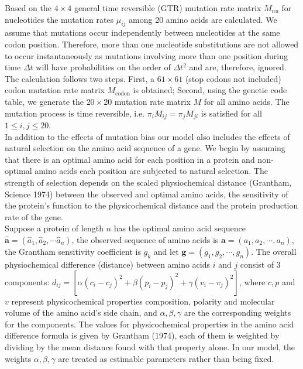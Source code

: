 \documentclass[13pt]{article}
\begin{document}
Based on the $4 \times 4$ general time reversible (GTR) mutation rate matrix $M_{nu}$ for nucleotides the mutation rates $\mu_{ij}$ among 20 amino acids are calculated. We assume that mutations occur independently between nucleotides at the same codon position. Therefore, more than one nucleotide substitutions are not allowed to occur instantaneously as mutations involving more than one position during time $\Delta t$ will have probabilities on the order of $\Delta t^2$ and are, therefore, ignored. The calculation follows two steps. First, a $61 \times 61$ (stop codons not included) codon mutation rate matrix $M_{\text{codon}}$ is obtained; Second, using the genetic code table, we generate the $20 \times 20$ mutation rate matrix $M$ for all amino acids. The mutation process is time reversible, i.e. $\pi_i M_{ij} = \pi_j M_{ji}$ is satisfied for all $1 \le i, j \le 20$.\\

In addition to the effects of mutation bias our model also includes the effects of natural selection on the amino acid sequence of a gene. We begin by assuming that there is an optimal amino acid for each position in a protein and non-optimal amino acids each position are subjected to natural selection. The strength of selection depends on the scaled physiochemical distance (Grantham, Science 1974) between the observed and optimal amino acids, the sensitivity of the protein's function to the physicochemical distance and the protein production rate of the gene. \\

Suppose a protein of length $n$ has the optimal amino acid sequence $\hat{\mathbf{a}} = (\hat{a}_1, \hat{a}_2, \cdots \hat{a}_n)$, the observed sequence of amino acids is $\mathbf{a} = (a_1, a_2, \cdots, a_n)$, the Grantham sensitivity coefficient is $g_k$ and let $\mathbf{g}=(g_1,g_2,\cdots,g_n)$. The overall physiochemical difference (distance) between amino acids $i$ and $j$ consist of 3 components: $d_{ij} = [\alpha (c_i-c_j)^2 + \beta (p_i - p_j)^2 + \gamma (v_i - v_j)^2]$, where $c, p$ and $v$ represent physicochemical properties composition, polarity and molecular volume of the amino acid's side chain, and $\alpha, \beta, \gamma$ are the corresponding weights for the components. The values for physicochemical properties in the amino acid difference formula is given by Grantham (1974), each of them is weighted by dividing by the mean distance found with that property alone. In our model, the weights $\alpha, \beta, \gamma$ are treated as estimable parameters rather than being fixed. \\
\end{document}
